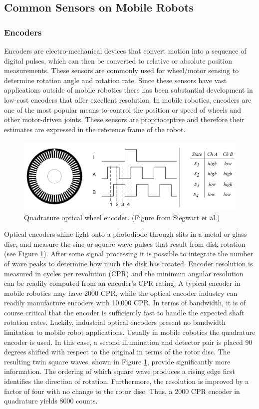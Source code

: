 \subsection{Common Sensors on Mobile Robots}
\subsubsection{Encoders} 
Encoders are electro-mechanical devices that convert motion into a sequence of digital pulses, which can then be converted to relative or absolute position measurements. These sensors are commonly used for wheel/motor sensing to determine rotation angle and rotation rate.
Since these sensors have vast applications outside of mobile robotics there has been substantial development in low-cost encoders that offer excellent resolution. In mobile robotics, encoders are one of the most popular means to control the position or speed of wheels and other motor-driven joints. These sensors are proprioceptive and therefore their estimates are expressed in the reference frame of the robot.

\begin{figure}[ht]
\centering
        \includegraphics[width=.9\textwidth]{tex/figs/ch07_figs/wheel_encoder.png}
        \caption{Quadrature optical wheel encoder. (Figure from Siegwart et al.) \nocite{SiegwartNourbakhshEtAl2011}}
        \label{fig:encoder}
\end{figure}
Optical encoders shine light onto a photodiode through slits in a metal or glass disc, and measure the sine or square wave pulses that result from disk rotation (see Figure \ref{fig:encoder}). After some signal processing it is possible to integrate the number of wave peaks to determine how much the disk has rotated.
Encoder resolution is measured in cycles per revolution (CPR) and the minimum angular resolution can be readily computed from an encoder’s CPR rating. A typical encoder in mobile robotics may have 2000 CPR, while the optical encoder industry can readily manufacture encoders with 10,000 CPR. In terms of bandwidth, it is of course critical that the encoder is sufficiently fast to handle the expected shaft rotation rates. Luckily, industrial optical encoders present no bandwidth limitation to mobile robot applications.
Usually in mobile robotics the quadrature encoder is used. In this case, a second illumination and detector pair is placed 90 degrees shifted with respect to the original in terms of the rotor disc. The resulting twin square waves, shown in Figure \ref{fig:encoder}, provide significantly more information. The ordering of which square wave produces a rising edge first identifies the direction of rotation. Furthermore, the resolution is improved by a factor of four with no change to the rotor disc. Thus, a 2000 CPR encoder in quadrature yields 8000 counts.

